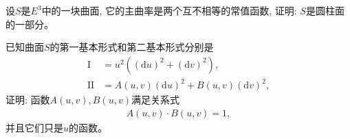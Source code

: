 \documentclass[../../main.tex]{subfiles}%
\begin{document}
\begin{example}
设$S$是$E^3$中的一块曲面, 它的主曲率是两个互不相等的常值函数, 证明: $S$是圆柱面的一部分。
\end{example}

\begin{example}
已知曲面$S$的第一基本形式和第二基本形式分别是
\begin{align*}
\mathrm{I} &= u^2\left((\mathrm{d}u)^2 + (\mathrm{d}v)^2\right),\\
\mathrm{II} &= A(u,v)(\mathrm{d}u)^2 + B(u,v)(\mathrm{d}v)^2,
\end{align*}
证明: 函数$A(u,v), B(u,v)$满足关系式
\begin{align*}
A(u,v)\cdot B(u,v) = 1,
\end{align*}
并且它们只是$u$的函数。
\end{example}
\end{document}
